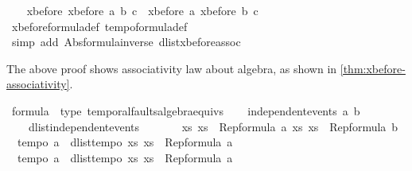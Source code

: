 \begin{isabellebody}
\ \ \isamarkupfalse%
\ {\isachardoublequoteopen}xbefore\ {\isacharparenleft}xbefore\ a\ b{\isacharparenright}\ c\ {\isacharequal}\ xbefore\ a\ {\isacharparenleft}xbefore\ b\ c{\isacharparenright}{\isachardoublequoteclose}\isanewline
\ \ \isamarkupfalse%
\ xbefore{\isacharunderscore}formula{\isacharunderscore}def\ tempo{}{\isacharunderscore}formula{\isacharunderscore}def\isanewline
\ \ \isamarkupfalse%
\ {\isacharparenleft}simp\ add{\isacharcolon}\ Abs{\isacharunderscore}formula{\isacharunderscore}inverse\ dlist{\isacharunderscore}xbefore{\isacharunderscore}assoc{\isacharparenright}\isanewline
{}\isamarkupfalse%
%
\endisatagproof
{\isafoldproof}%
%
\isadelimproof
%
\endisadelimproof
%
\begin{isamarkuptext}%
The above proof shows associativity law about \ac{algebra}, as shown in \cref{thm:xbefore-associativity}.%
\end{isamarkuptext}\isamarkuptrue%
\isamarkupfalse%
%
\isamarkuptrue%
\isamarkupfalse%
\ formula\ {\isacharcolon}{\isacharcolon}\ {\isacharparenleft}type{\isacharparenright}\ temporal{\isacharunderscore}faults{\isacharunderscore}algebra{\isacharunderscore}equivs\isanewline
{}\isanewline
\isanewline
{}\isamarkupfalse%
\ \isanewline
\ \ {\isachardoublequoteopen}independent{\isacharunderscore}events\ a\ b\ {\isacharequal}\ \isanewline
\ \ \ \ dlist{\isacharunderscore}independent{\isacharunderscore}events\ \isanewline
\ \ \ \ \ \ {\isacharparenleft}{\isasymlambda}xs{\isachardot}\ xs\ {\isasymin}\ Rep{\isacharunderscore}formula\ a{\isacharparenright}\ {\isacharparenleft}{\isasymlambda}xs{\isachardot}\ xs\ {\isasymin}\ Rep{\isacharunderscore}formula\ b{\isacharparenright}{\isachardoublequoteclose}\isanewline
\isanewline
{}\isamarkupfalse%
\ \isanewline
\ \ {\isachardoublequoteopen}tempo{}\ a\ {\isacharequal}\ dlist{\isacharunderscore}tempo{}\ {\isacharparenleft}{\isasymlambda}xs{\isachardot}\ xs\ {\isasymin}\ Rep{\isacharunderscore}formula\ a{\isacharparenright}{\isachardoublequoteclose}\isanewline
\isanewline
{}\isamarkupfalse%
\ \isanewline
\ \ {\isachardoublequoteopen}tempo{}\ a\ {\isacharequal}\ dlist{\isacharunderscore}tempo{}\ {\isacharparenleft}{\isasymlambda}xs{\isachardot}\ xs\ {\isasymin}\ Rep{\isacharunderscore}formula\ a{\isacharparenright}{\isachardoublequoteclose}\isanewline

\end{isabellebody}

